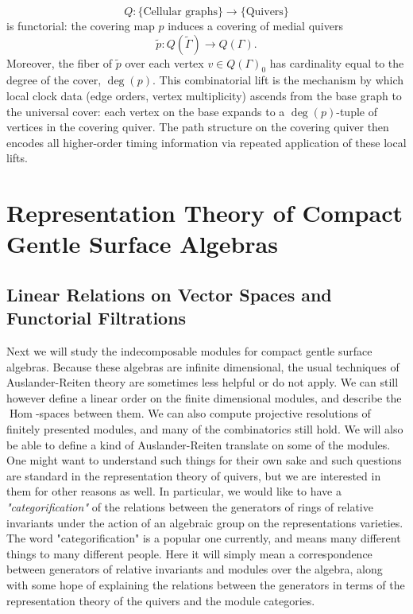 \documentclass[11pt,oneside]{amsbook}
\numberwithin{equation}{section}
\theoremstyle{plain}
\theoremstyle{definition}
\theoremstyle{remark}
\newenvironment{fullwidth}{\par\noindent}{\par}
\DeclareMathOperator{\Hom}{\mathrm{Hom}}
\begin{document}
	\[
	Q: \{\text{Cellular graphs}\} \to \{\text{Quivers}\}
	\]
	is functorial: the covering map $p$ induces a covering of medial quivers
	\[
	\tilde{p}: Q(\tilde{\Gamma}) \to Q(\Gamma).
	\]
	Moreover, the fiber of $\tilde{p}$ over each vertex $v \in Q(\Gamma)_0$ has cardinality equal to the degree of the cover, $\deg(p)$. This combinatorial lift is the mechanism by which local clock data (edge orders, vertex multiplicity) ascends from the base graph to the universal cover: each vertex on the base expands to a $\deg(p)$-tuple of vertices in the covering quiver. The path structure on the covering quiver then encodes all higher-order timing information via repeated application of these local lifts.

	\begin{fullwidth}
		\part{Representation Theory of Compact Gentle Surface Algebras}
	\end{fullwidth}
	
	
	\chapter{Linear Relations on Vector Spaces and Functorial Filtrations}\label{ch:6}
	\begin{fullwidth}
		Next we will study the indecomposable modules for compact gentle surface algebras. Because these algebras are infinite dimensional, the usual techniques of Auslander-Reiten theory are sometimes less helpful or do not apply. We can still however define a linear order on the finite dimensional modules, and describe the $\Hom$-spaces between them. We can also compute projective resolutions of finitely presented modules, and many of the combinatorics still hold. We will also be able to define a kind of Auslander-Reiten translate on some of the modules. One might want to understand such things for their own sake and such questions are standard in the representation theory of quivers, but we are interested in them for other reasons as well. In particular, we would like to have a \textit{"categorification"} of the relations between the generators of rings of relative invariants under the action of an algebraic group on the representations varieties. The word "categorification" is a popular one currently, and means many different things to many different people. Here it will simply mean a correspondence between generators of relative invariants and modules over the algebra, along with some hope of explaining the relations between the generators in terms of the representation theory of the quivers and the module categories. 
	\end{fullwidth}
	
\end{document}
